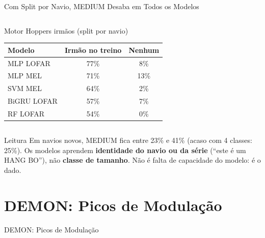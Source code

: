 \documentclass[aspectratio=169]{beamer}
\begin{document}
\begin{frame}{Com Split por Navio, MEDIUM Desaba em Todos os Modelos}
\begin{columns}[t]
\begin{block}{\small Motor Hoppers irmãos (split por navio)}
            \vspace{0.05cm}
            \begin{tabular}{lcc}
            \toprule
            Modelo & Irmão no treino & Nenhum \\
            \midrule
            MLP LOFAR & 77\% & 8\% \\
            MLP MEL & 71\% & 13\% \\
            SVM MEL & 64\% & 2\% \\
            BiGRU LOFAR & 57\% & 7\% \\
            RF LOFAR & 54\% & 0\% \\
            \bottomrule
            \end{tabular}
        \end{block}
    \end{columns}
    \vspace{0.1cm}
    \begin{alertblock}{Leitura}
        \scriptsize
        Em navios novos, MEDIUM fica entre 23\% e 41\% (acaso com 4 classes: 25\%). Os modelos aprendem \textbf{identidade do navio ou da série} (``este é um HANG BO''), não \textbf{classe de tamanho}. Não é falta de capacidade do modelo: é o dado.
    \end{alertblock}
\end{frame}

\section{DEMON: Picos de Modulação}

\begin{frame}
    \centering
    \huge DEMON: Picos de Modulação
\end{frame}
\end{document}
